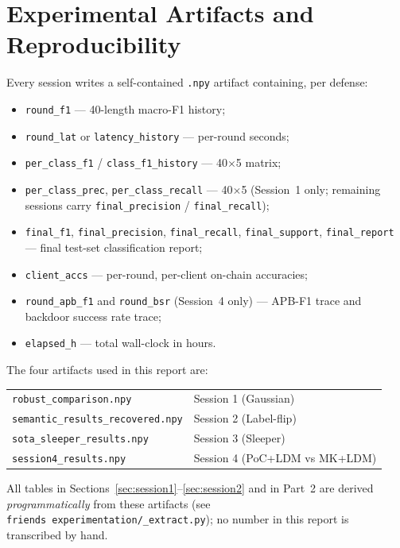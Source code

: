 \documentclass[11pt,a4paper]{article}
\begin{document}
\section{Experimental Artifacts and Reproducibility}
\label{sec:artifacts}

Every session writes a self-contained \texttt{.npy} artifact containing,
per defense:
\begin{itemize}[nosep]
    \item \texttt{round\_f1} --- 40-length macro-F1 history;
    \item \texttt{round\_lat} or \texttt{latency\_history} --- per-round seconds;
    \item \texttt{per\_class\_f1} / \texttt{class\_f1\_history} --- 40$\times$5 matrix;
    \item \texttt{per\_class\_prec}, \texttt{per\_class\_recall} --- 40$\times$5 (Session~1 only; remaining sessions carry \texttt{final\_precision} / \texttt{final\_recall});
    \item \texttt{final\_f1}, \texttt{final\_precision}, \texttt{final\_recall}, \texttt{final\_support}, \texttt{final\_report} --- final test-set classification report;
    \item \texttt{client\_accs} --- per-round, per-client on-chain accuracies;
    \item \texttt{round\_apb\_f1} and \texttt{round\_bsr} (Session~4 only) --- APB-F1 trace and backdoor success rate trace;
    \item \texttt{elapsed\_h} --- total wall-clock in hours.
\end{itemize}

The four artifacts used in this report are:
\begin{center}
\begin{tabular}{ll}
\toprule
\texttt{robust\_comparison.npy}           & Session 1 (Gaussian)     \\
\texttt{semantic\_results\_recovered.npy} & Session 2 (Label-flip)   \\
\texttt{sota\_sleeper\_results.npy}       & Session 3 (Sleeper)      \\
\texttt{session4\_results.npy}            & Session 4 (PoC+LDM vs MK+LDM) \\
\bottomrule
\end{tabular}
\end{center}

All tables in Sections~\ref{sec:session1}--\ref{sec:session2} and in
Part~2 are derived \textit{programmatically} from these artifacts (see
\texttt{friends\ experimentation/\_extract.py}); no number in this report
is transcribed by hand.
\end{document}
